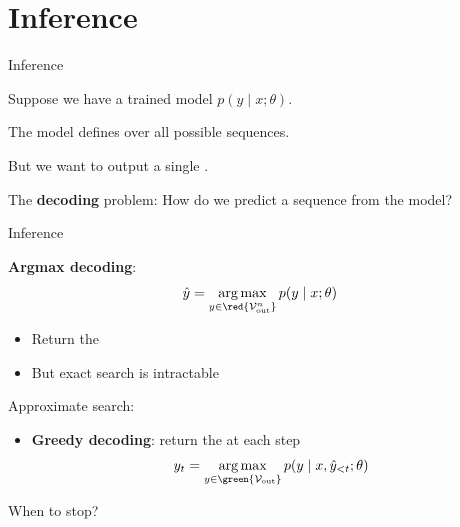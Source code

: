 \documentclass[usenames,dvipsnames,notes,11pt,aspectratio=169,hyperref={colorlinks=true, linkcolor=blue}]{beamer}
\begin{document}
\section{Inference}
\begin{frame}
    {Inference}

    Suppose we have a trained model $p(y\mid x;\theta)$.

    The model defines  over all possible sequences.

    But we want to output a single .

    The \textbf{decoding} problem: How do we predict a sequence from the model?
\end{frame}

\begin{frame}
    {Inference}

    \textbf{Argmax decoding}: 
    $$
    \hat{y} = \argmax_{y\in\red{\sV_{\text{out}}^n}} p(y\mid x; \theta)
    $$
    \vspace{-1em}
    \begin{itemize}
        \item Return the 
        \item But exact search is intractable 
    \end{itemize}

    \pause
    Approximate search:\\
    \begin{itemize}
        \item \textbf{Greedy decoding}: return the  at each step
            $$
            y_t = \argmax_{y\in\green{\sV_{\text{out}}}} p(y\mid x, \hat{y}_{<t}; \theta)
            $$
    \end{itemize}

    When to stop?
\end{frame}
\end{document}
